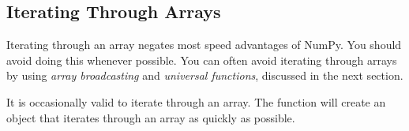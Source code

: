 \subsection*{Iterating Through Arrays} %

Iterating through an array negates most speed advantages of NumPy. 
You should avoid doing this whenever possible.
You can often avoid iterating through arrays by using \emph{array broadcasting} and \emph{universal functions}, discussed in the next section.

It is occasionally valid to iterate through an array. 
The function  will create an object that iterates through an array as quickly as possible.


